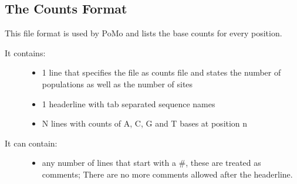 \documentclass[letterpaper,10pt,english]{sphinxmanual}
\begin{document}
\subsection{The Counts Format}
\label{cf:the-counts-format}
This file format is used by PoMo and lists the base
counts for every position.
\begin{description}
\item[{It contains:}] \leavevmode\begin{itemize}
\item {} 
1 line that specifies the file as counts file and states the
number of populations as well as the number of sites

\item {} 
1 headerline with tab separated sequence names

\item {} 
N lines with counts of A, C, G and T bases at position n

\end{itemize}

\item[{It can contain:}] \leavevmode\begin{itemize}
\item {} 
any number of lines that start with a \#, these are treated as
comments; There are no more comments allowed after the headerline.

\end{itemize}

\end{description}
\end{document}
